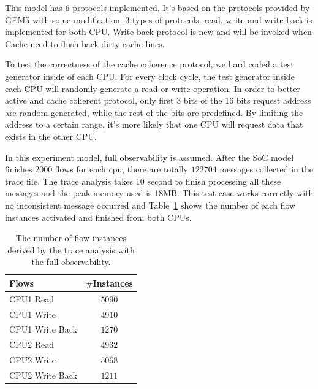 \documentclass[12pt,frontmatter,copyright,thesis]{usfmanus}
\begin{document}
This model has 6 protocols implemented. It's based on the protocols provided by GEM5 with some modification. 3 types of protocols: read, write and write back is implemented for both CPU. Write back protocol is new and will be invoked when Cache need to flush back dirty cache lines.

To test the correctness of the cache coherence protocol, we hard coded a test generator inside
of each CPU. 
For every clock cycle, the test generator inside each CPU will randomly generate a read or write operation. In order to better active and cache coherent protocol, only first 3 bits of the 16 bits request address are random generated, while the rest of the bits are predefined. By limiting the address to a certain range, it's more likely that one CPU will request data that exists in the other CPU.

In this experiment model, full observability is assumed.
After the SoC model finishes 2000 flows for each cpu, there
are totally $122704$ messages collected in the trace file.
The trace analysis takes 10 second to finish processing
all these messages and the peak memory used is 18MB.
This test case works correctly with no inconsistent message occurred 
and
Table~\ref{table-case-3} shows the number of each flow instances activated and
finished from both CPUs.
\begin{table}[h]
\caption{The number of flow instances derived by the trace analysis with the full observability.}
\begin{center}
\begin{tabular}{|l|c|}
\hline
Flows & $\#$Instances \\
\hline
\hline
CPU1 Read			&  $5090$\\
CPU1 Write				&  $4910$\\
CPU1 Write Back				&  $1270$\\

\hline
CPU2 Read			&  $4932$\\
CPU2 Write				&  $5068$\\
CPU2 Write Back				&  $1211$\\
\hline
\end{tabular}
\end{center}
\label{table-case-3}
\end{table}%
\end{document}
